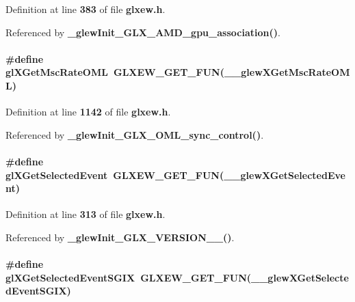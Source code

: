Definition at line {\bf 383} of file {\bf glxew.\+h}.



Referenced by {\bf \+\_\+glew\+Init\+\_\+\+G\+L\+X\+\_\+\+A\+M\+D\+\_\+gpu\+\_\+association()}.

\paragraph[{gl\+X\+Get\+Msc\+Rate\+O\+ML}]{\setlength{\rightskip}{0pt plus 5cm}\#define gl\+X\+Get\+Msc\+Rate\+O\+ML~{\bf G\+L\+X\+E\+W\+\_\+\+G\+E\+T\+\_\+\+F\+UN}({\bf \+\_\+\+\_\+glew\+X\+Get\+Msc\+Rate\+O\+ML})}\label{glxew_8h_a21c7472cc8be1db27ab7cf156f5fc34d}


Definition at line {\bf 1142} of file {\bf glxew.\+h}.



Referenced by {\bf \+\_\+glew\+Init\+\_\+\+G\+L\+X\+\_\+\+O\+M\+L\+\_\+sync\+\_\+control()}.

\paragraph[{gl\+X\+Get\+Selected\+Event}]{\setlength{\rightskip}{0pt plus 5cm}\#define gl\+X\+Get\+Selected\+Event~{\bf G\+L\+X\+E\+W\+\_\+\+G\+E\+T\+\_\+\+F\+UN}({\bf \+\_\+\+\_\+glew\+X\+Get\+Selected\+Event})}\label{glxew_8h_aefcf2e90314d8b2fd701f96aa56883a4}


Definition at line {\bf 313} of file {\bf glxew.\+h}.



Referenced by {\bf \+\_\+glew\+Init\+\_\+\+G\+L\+X\+\_\+\+V\+E\+R\+S\+I\+O\+N\+\_\+\_()}.

\paragraph[{gl\+X\+Get\+Selected\+Event\+S\+G\+IX}]{\setlength{\rightskip}{0pt plus 5cm}\#define gl\+X\+Get\+Selected\+Event\+S\+G\+IX~{\bf G\+L\+X\+E\+W\+\_\+\+G\+E\+T\+\_\+\+F\+UN}({\bf \+\_\+\+\_\+glew\+X\+Get\+Selected\+Event\+S\+G\+IX})}\label{glxew_8h_ad2b91d235c977a66676ef4cf29688900}


